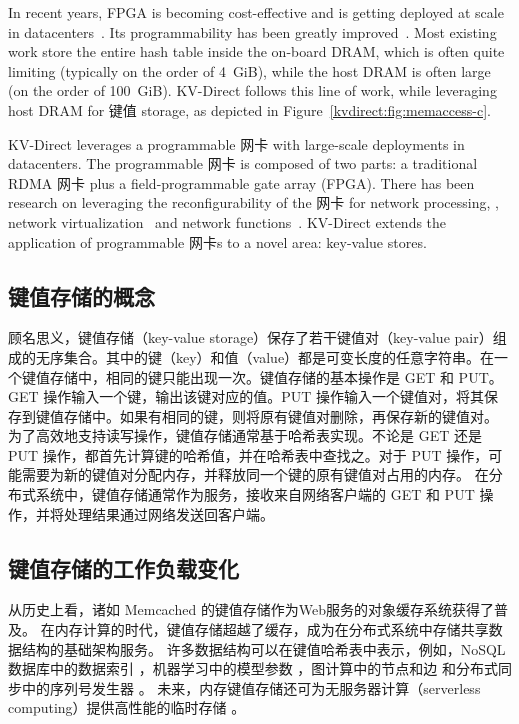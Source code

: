 {In recent years, FPGA is becoming cost-effective and is getting deployed at scale in datacenters~\cite{putnam2014programmable, caulfield2016cloud}. Its programmability has been greatly improved~\cite{li2016clicknp}.
Most existing work store the entire hash table inside the on-board DRAM, which is often quite limiting (typically on the order of 4~GiB), while the host DRAM is often large (on the order of 100~GiB).
KV-Direct follows this line of work, while leveraging host DRAM for 键值 storage, as depicted in Figure~\ref{kvdirect:fig:memaccess-c}.

KV-Direct leverages a programmable 网卡 with large-scale deployments in datacenters.
The programmable 网卡 is composed of two parts: a traditional RDMA 网卡 plus a field-programmable gate array (FPGA).
There has been research on leveraging the reconfigurability of the 网卡 for network processing, \eg, network virtualization~\cite{greenberg2015sdn, vfp} and network functions~\cite{li2016clicknp}.
KV-Direct extends the application of programmable 网卡s to a novel area: key-value stores.
}

\subsection{键值存储的概念}
\label{kvdirect:sec:kvs}

顾名思义，键值存储（key-value storage）保存了若干键值对（key-value pair）组成的无序集合。其中的键（key）和值（value）都是可变长度的任意字符串。在一个键值存储中，相同的键只能出现一次。键值存储的基本操作是 GET 和 PUT。GET 操作输入一个键，输出该键对应的值。PUT 操作输入一个键值对，将其保存到键值存储中。如果有相同的键，则将原有键值对删除，再保存新的键值对。
为了高效地支持读写操作，键值存储通常基于哈希表实现。不论是 GET 还是 PUT 操作，都首先计算键的哈希值，并在哈希表中查找之。对于 PUT 操作，可能需要为新的键值对分配内存，并释放同一个键的原有键值对占用的内存。
在分布式系统中，键值存储通常作为服务，接收来自网络客户端的 GET 和 PUT 操作，并将处理结果通过网络发送回客户端。

\subsection{键值存储的工作负载变化}
\label{kvdirect:sec:workload-shift}


从历史上看，诸如 Memcached \cite {fitzpatrick2004distributed} 的键值存储作为Web服务的对象缓存系统获得了普及。
在内存计算的时代，键值存储超越了缓存，成为在分布式系统中存储共享数据结构的基础架构服务。
许多数据结构可以在键值哈希表中表示，例如，NoSQL 数据库中的数据索引 \cite {chang2008bigtable}，机器学习中的模型参数 \cite {li2014scaling}，图计算中的节点和边 \cite {shao2013trinity,xiao17tux2} 和分布式同步中的序列号发生器 \cite {kalia2016design,eris}。
未来，内存键值存储还可为无服务器计算（serverless computing）提供高性能的临时存储 \cite{jonas2019cloud}。

